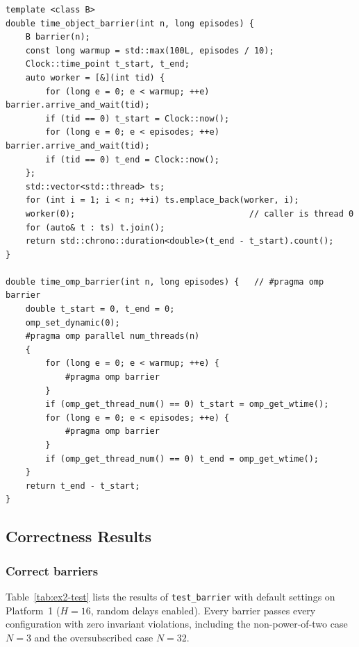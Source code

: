 \begin{lstlisting}[caption={Timing loop of the benchmark (\texttt{bench\_barrier.cpp}).},label={lst:ex2-bench}]
template <class B>
double time_object_barrier(int n, long episodes) {
    B barrier(n);
    const long warmup = std::max(100L, episodes / 10);
    Clock::time_point t_start, t_end;
    auto worker = [&](int tid) {
        for (long e = 0; e < warmup; ++e) barrier.arrive_and_wait(tid);
        if (tid == 0) t_start = Clock::now();
        for (long e = 0; e < episodes; ++e) barrier.arrive_and_wait(tid);
        if (tid == 0) t_end = Clock::now();
    };
    std::vector<std::thread> ts;
    for (int i = 1; i < n; ++i) ts.emplace_back(worker, i);
    worker(0);                                   // caller is thread 0
    for (auto& t : ts) t.join();
    return std::chrono::duration<double>(t_end - t_start).count();
}

double time_omp_barrier(int n, long episodes) {   // #pragma omp barrier
    double t_start = 0, t_end = 0;
    omp_set_dynamic(0);
    #pragma omp parallel num_threads(n)
    {
        for (long e = 0; e < warmup; ++e) {
            #pragma omp barrier
        }
        if (omp_get_thread_num() == 0) t_start = omp_get_wtime();
        for (long e = 0; e < episodes; ++e) {
            #pragma omp barrier
        }
        if (omp_get_thread_num() == 0) t_end = omp_get_wtime();
    }
    return t_end - t_start;
}
\end{lstlisting}

\subsection{Correctness Results}
\label{sec:ex2-correct-results}

\subsubsection{Correct barriers}

Table~\ref{tab:ex2-test} lists the results of \texttt{test\_barrier} with
default settings on Platform~1 ($H = 16$, random delays enabled). Every
barrier passes every configuration with zero invariant violations,
including the non-power-of-two case $N=3$ and the oversubscribed case
$N=32$.

\begin{table}[H]
\centering
\caption{Correctness test results on Platform 1 (default settings). ``Time''
is the wall-clock time of the whole run including random delays, so it is
\emph{not} a performance metric.}
\label{tab:ex2-test}
\small

\end{table}

